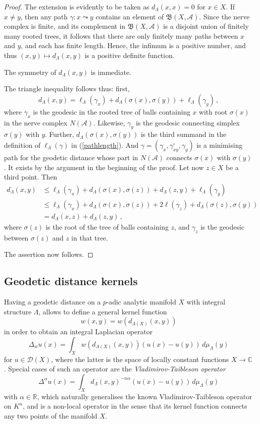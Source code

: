 \documentclass[a4paper,draft]{ZbRad}
\theoremstyle{plain}
\theoremstyle{definition}
\numberwithin{equation}{section}
\renewcommand{\le}{\leqslant}\renewcommand{\leq}{\leqslant}
\begin{document}
\begin{proof}
The extension is evidently to be taken as $d_\Lambda(x,x)=0$ for $x\in X$. If $x\neq y$, then any path $\gamma\colon x\leadsto y$ contains an element of $\mathfrak{B}(X,\mathcal{A})$. Since the nerve complex is finite, and its complement in $\mathfrak{B}(X,\mathcal{A})$ is a disjoint union of finitely many rooted trees, it follows that there are only finitely many paths between $x$ and $y$, and each has finite length. Hence, the infimum is a positive number, and thus $(x,y)\mapsto d_\Lambda(x,y)$ is a positive definite function.  

\smallskip
The symmetry of $d_\Lambda(x,y)$ is immediate.

\smallskip
The triangle inequality follows thus: first,
\[
d_\Lambda(x,y)=\ell_\Lambda(\gamma_x)+d_\Lambda(\sigma(x),\sigma(y))+\ell_\Lambda(\gamma_y)\,,
\]
where $\gamma_x$ is the geodesic in the rooted tree of balls containing $x$ with root $\sigma(x)$ in the nerve complex $N(\mathcal{A})$. Likewise, $\gamma_y$ is the geodesic connecting simplex $\sigma(y)$ with $y$. Further, $d_\Lambda(\sigma(x),\sigma(y))$ is the third summand in the definition of $\ell_\Lambda(\gamma)$ in (\ref{pathlength}). And $\gamma=(\gamma_x,\gamma_{xy}^\circ,\gamma_y)$ is a minimising path for the geodetic distance whose part in $N(\mathcal{A})$ connects $\sigma(x)$ with $\sigma(y)$. It exists by the argument in the beginning of the proof. Let now $z\in X$ be a third point. Then 
\begin{align*}
d_\Lambda(x,y)&\le\ell_\Lambda(\gamma_x)+d_\Lambda(\sigma(x),\sigma(z))+d_\Lambda(z,y)+\ell_\Lambda(\gamma_y)
\\
&\le\ell_\Lambda(\gamma_x)+d_\Lambda(\sigma(x),\sigma(z))+2\ell(\gamma_z)+d_\Lambda(\sigma(z),\sigma(y))
\\
&=d_\Lambda(x,z)+d_\Lambda(z,y)\,,
\end{align*}
where $\sigma(z)$ is the root of the tree of balls containing $z$, and $\gamma_z$ is the geodesic between $\sigma(z)$ and $z$ in that tree.

\smallskip
The assertion now follows.
\end{proof}

\subsection{Geodetic distance kernels}
Having a geodetic distance on a $p$-adic analytic manifold $X$ with integral structure $\Lambda$, allows to define a 
general kernel function
\[
w(x,y)=w(d_{\Lambda(X)}(x,y))
\]
in order to obtain an integral Laplacian
operator
\[
\Delta_wu(x)=\int_Xw(d_{\Lambda(X)}(x,y))(u(x)-u(y))\,d\mu_\Lambda(y)
\]
for $u\in\mathcal{D}(X)$, where the latter is the space of locally constant functions $X\to\mathbb{C}$.
Special cases of such an operator are the \emph{Vladimirov-Taibleson operator}
\[
\Delta^\alpha u(x)=\int_Xd_\Lambda(x,y)^{-n\alpha}(u(x)-u(y))\,d\mu_\Lambda(y)
\]
with $\alpha\in\mathbb{R}$, 
which naturally generalises the known Vladimirov-Taibleson operator on $K^n$, and is a non-local operator in the sense that its kernel function connects any two points of the manifold $X$.
\newline
\end{document}
